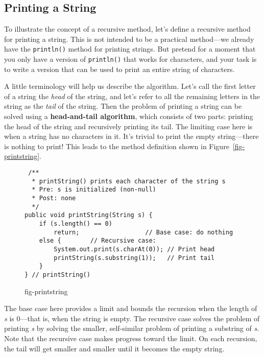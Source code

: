 \subsection{Printing a String}
\noindent To illustrate the concept of a recursive method, let's define a
recursive method for printing a string.  This is not intended to be a
practical method---we already have the {\tt println()} method for
printing strings.   But pretend for a moment that you only have a
version of {\tt println()} that works for characters, and your task is
to write a version that can be used to print an entire string of
characters.

A little terminology will help us describe the algorithm.  Let's call
the first letter of a string the {\it head} of the string, and let's
refer to all the remaining letters in the string as the {\it tail} of
the string.  Then the problem of printing a string can be solved using
a {\bf head-and-tail algorithm}, 
which consists of two parts: printing
the head of the string and recursively printing its tail.  The
limiting case here is when a string has no characters in it.  It's
trivial to print the empty string---there is nothing to print!  This
leads to the method definition shown in Figure~\ref{fig-printstring}.

\begin{figure}[htb]
\jjjprogstart
\begin{jjjlisting}
\begin{lstlisting}
 /**
  * printString() prints each character of the string s
  * Pre: s is initialized (non-null)
  * Post: none
  */
public void printString(String s) {
    if (s.length() == 0)
        return;                  // Base case: do nothing
    else {        // Recursive case: 
        System.out.print(s.charAt(0)); // Print head
        printString(s.substring(1));   // Print tail
    }
} // printString()
\end{lstlisting}
\end{jjjlisting}
{fig-printstring}
\end{figure}

The base case here provides a limit and bounds the recursion
when the length of {\it s} is 0---that is, when the string is
empty.  The recursive case solves the problem of printing {\it s} by
solving the smaller, self-similar problem of printing a substring of
{\it s}.  Note that the recursive case makes progress toward the
limit.  On each recursion, the tail will get smaller and smaller until it
becomes the empty string.

